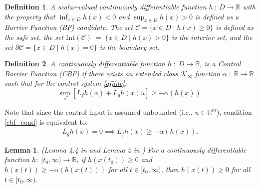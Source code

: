 \documentclass[letterpaper, 10 pt, conference]{ieeeconf}
\newtheorem{definition}{Definition}
\newtheorem{lemma}{Lemma}
\newcommand{\TODO}[1]{{\color{black}#1}}
\begin{document}
\begin{definition}
    A scalar-valued continuously differentiable function $h \ : \ D \rightarrow \mathbb{R}$ with the property that $\inf_{x \in D} h(x) < 0$ and $\sup_{x \in D} h(x) > 0$ is defined as a \textit{Barrier Function (BF) candidate}. The set $\mathcal{C} = \{ x \in D \mid h(x) \geq 0\}$ is defined as the \textit{safe set}, the set $\text{Int}(\mathcal{C}) \; = \; \{x \in D \mid h(x) > 0 \}$ is the \textit{interior set}, and the set $\partial \mathcal{C} = \{ x \in D \mid h(x) = 0\}$ is the \textit{boundary set}.
\end{definition}

\begin{definition}
    A continuously differentiable function $h \; : \; D \rightarrow \mathbb{R}$, is a \textit{Control Barrier Function (CBF)} if there exists an extended class $\mathcal{K}_{\infty}$ function $\alpha \; : \; \mathbb{R} \rightarrow \mathbb{R}$ such that for the control system \eqref{affine}:
    \begin{equation}
        \sup_{u} [L_{f}h(x) + L_{g}h(x)u] \geq -\alpha (h(x)).\label{cbf_cond}
    \end{equation}
\end{definition}

Note that since \TODO{the control input is assumed unbounded (i.e., $u \in \mathbb{R}^m$)}, condition \eqref{cbf_cond} is equivalent to:
\begin{align}
    L_gh(x) = 0 \implies L_fh(x) \geq -\alpha(h(x)).\label{cbf_Lgh_cond}
\end{align}
\begin{lemma}\label{lemma_forward_invariance}
    \textit{(Lemma 4.4 in \cite{khalil_nonlinear_2002} and Lemma 2 in \cite{glotfelter2017nonsmooth})} For a continuously differentiable function $h:\; [t_0,\infty) \rightarrow \mathbb{R}$, if $h(x(t_0)) \geq 0$ and $\dot{h}(x(t)) \geq -\alpha(h(x(t)))$ for all $t \in [t_0,\infty)$, then $h(x(t)) \geq 0$ for all $t \in [t_0,\infty)$.
\end{lemma}
\end{document}
